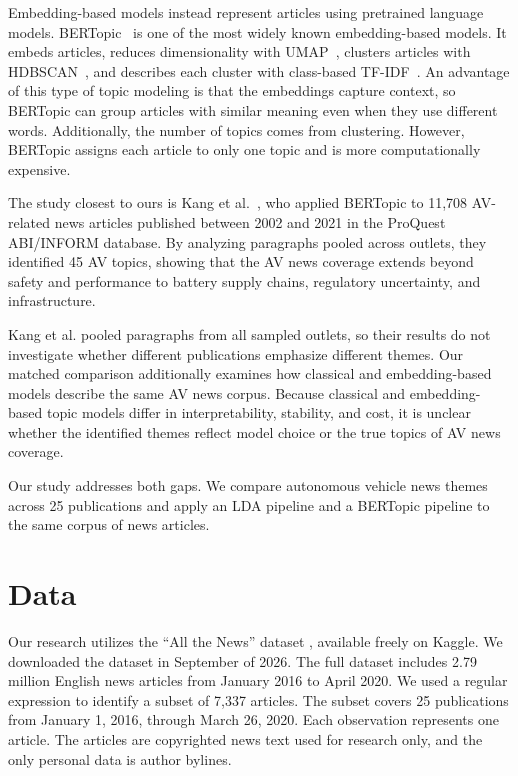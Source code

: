 \documentclass[conference]{IEEEtran}
\begin{document}
Embedding-based models instead represent articles using pretrained language models. BERTopic~\cite{grootendorst2022bertopic} is one of the most widely known embedding-based models. It embeds articles, reduces dimensionality with UMAP~\cite{mcinnes2018umap}, clusters articles with HDBSCAN~\cite{campello2013hdbscan}, and describes each cluster with class-based TF-IDF~\cite{alammar2024}. An advantage of this type of topic modeling is that the embeddings capture context, so BERTopic can group articles with similar meaning even when they use different words. Additionally, the number of topics comes from clustering. However, BERTopic assigns each article to only one topic and is more computationally expensive. 

The study closest to ours is Kang et al.~\cite{kang2025unveiling}, who applied BERTopic to 11,708 AV-related news articles published between 2002 and 2021 in the ProQuest ABI/INFORM database. By analyzing paragraphs pooled across outlets, they identified 45 AV topics, showing that the AV news coverage extends beyond safety and performance to battery supply chains, regulatory uncertainty, and infrastructure. 

Kang et al. pooled paragraphs from all sampled outlets, so their results do not investigate whether different publications emphasize different themes. Our matched comparison additionally examines how classical and embedding-based models describe the same AV news corpus. Because classical and embedding-based topic models differ in interpretability, stability, and cost, it is unclear whether the identified themes reflect model choice or the true topics of AV news coverage.

Our study addresses both gaps. We compare autonomous vehicle news themes across 25 publications and apply an LDA pipeline and a BERTopic pipeline to the same corpus of news articles.


\section*{Data}
Our research utilizes the ``All the News'' dataset \cite{mckinley2021}, available freely on Kaggle. We downloaded the dataset in September of 2026. The full dataset includes 2.79 million English news articles from January 2016 to April 2020. We used a regular expression to identify a subset of 7,337 articles. The subset covers 25 publications from January 1, 2016, through March 26, 2020. Each observation represents one article. The articles are copyrighted news text used for research only, and the only personal data is author bylines.
\end{document}

